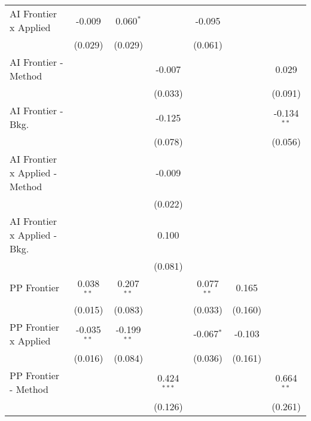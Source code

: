 \begin{tabular}{lcccccc}
   AI Frontier x Applied          & -0.009         & 0.060$^{*}$    &                & -0.095         &              &   \\   
                                  & (0.029)        & (0.029)        &                & (0.061)        &              &   \\   
   AI Frontier - Method           &                &                & -0.007         &                &              & 0.029\\   
                                  &                &                & (0.033)        &                &              & (0.091)\\   
   AI Frontier - Bkg.             &                &                & -0.125         &                &              & -0.134$^{**}$\\   
                                  &                &                & (0.078)        &                &              & (0.056)\\   
   AI Frontier x Applied - Method &                &                & -0.009         &                &              &   \\   
                                  &                &                & (0.022)        &                &              &   \\   
   AI Frontier x Applied - Bkg.   &                &                & 0.100          &                &              &   \\   
                                  &                &                & (0.081)        &                &              &   \\   
   PP Frontier                    & 0.038$^{**}$   & 0.207$^{**}$   &                & 0.077$^{**}$   & 0.165        &   \\   
                                  & (0.015)        & (0.083)        &                & (0.033)        & (0.160)      &   \\   
   PP Frontier x Applied          & -0.035$^{**}$  & -0.199$^{**}$  &                & -0.067$^{*}$   & -0.103       &   \\   
                                  & (0.016)        & (0.084)        &                & (0.036)        & (0.161)      &   \\   
   PP Frontier - Method           &                &                & 0.424$^{***}$  &                &              & 0.664$^{**}$\\   
                                  &                &                & (0.126)        &                &              & (0.261)\\   

\end{tabular}

